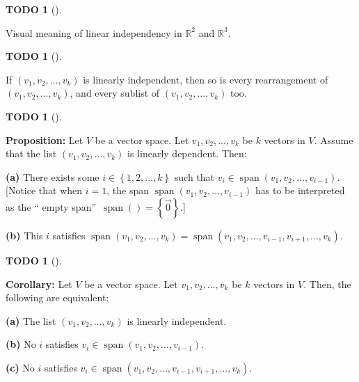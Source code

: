 \documentclass[numbers=enddot,12pt,final,onecolumn,notitlepage]{scrartcl}%
\theoremstyle{definition}
\newtheorem{quest}[theo]{TODO}
\newenvironment{todo}[1][]
{\begin{quest}[#1]\begin{leftbar}}
{\end{leftbar}\end{quest}}
\begin{document}
\begin{todo}
Visual meaning of linear independency in $\mathbb{R}^{2}$ and $\mathbb{R}^{3}$.
\end{todo}



\begin{todo}
If $\left(  v_{1},v_{2},\ldots,v_{k}\right)  $ is linearly independent, then
so is every rearrangement of $\left(  v_{1},v_{2},\ldots,v_{k}\right)  $, and
every sublist of $\left(  v_{1},v_{2},\ldots,v_{k}\right)  $ too.
\end{todo}



\begin{todo}
\textbf{Proposition:} Let $V$ be a vector space. Let $v_{1},v_{2},\ldots
,v_{k}$ be $k$ vectors in $V$. Assume that the list $\left(  v_{1}%
,v_{2},\ldots,v_{k}\right)  $ is linearly dependent. Then:

\textbf{(a)} There exists some $i\in\left\{  1,2,\ldots,k\right\}  $ such that
$v_{i}\in\operatorname*{span}\left(  v_{1},v_{2},\ldots,v_{i-1}\right)  $.
[Notice that when $i=1$, the span $\operatorname*{span}\left(  v_{1}%
,v_{2},\ldots,v_{i-1}\right)  $ has to be interpreted as the \textquotedblleft
empty span\textquotedblright\ $\operatorname*{span}\left(  {}\right)
=\left\{  \overrightarrow{0}\right\}  $.]

\textbf{(b)} This $i$ satisfies $\operatorname*{span}\left(  v_{1}%
,v_{2},\ldots,v_{k}\right)  =\operatorname*{span}\left(  v_{1},v_{2}%
,\ldots,v_{i-1},v_{i+1},\ldots,v_{k}\right)  $.
\end{todo}



\begin{todo}
\textbf{Corollary:} Let $V$ be a vector space. Let $v_{1},v_{2},\ldots,v_{k}$
be $k$ vectors in $V$. Then, the following are equivalent:

\textbf{(a)} The list $\left(  v_{1},v_{2},\ldots,v_{k}\right)  $ is linearly independent.

\textbf{(b)} No $i$ satisfies $v_{i}\in\operatorname*{span}\left(  v_{1}%
,v_{2},\ldots,v_{i-1}\right)  $.

\textbf{(c)} No $i$ satisfies $v_{i}\in\operatorname*{span}\left(  v_{1}%
,v_{2},\ldots,v_{i-1},v_{i+1},\ldots,v_{k}\right)  $.
\end{todo}
\end{document}
